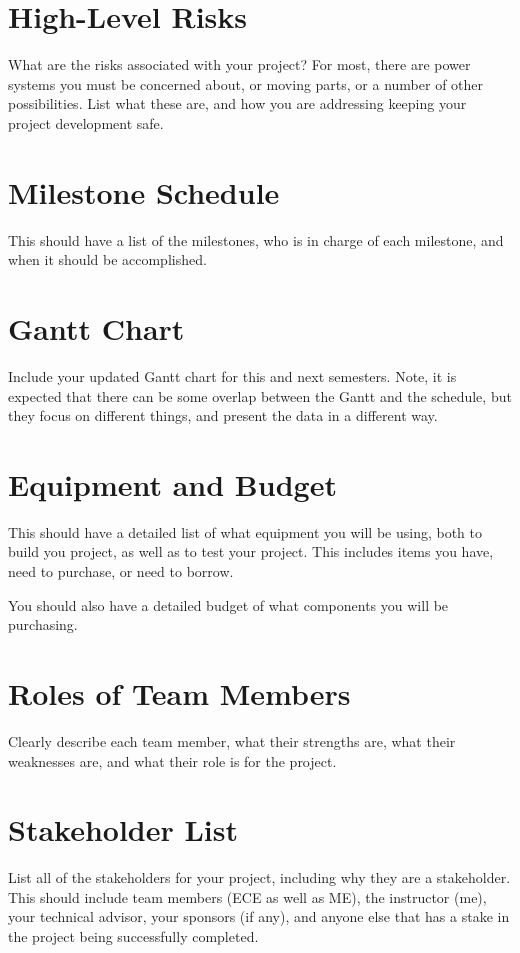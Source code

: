 \section{High-Level Risks}
What are the risks associated with your project?  For most, there are power systems you must be concerned about,
or moving parts, or a number of other possibilities.  List what these are, and how you are addressing keeping
your project development safe.

\section{Milestone Schedule}
This should have a list of the milestones, who is in charge of each milestone, and when it should be accomplished.

\section{Gantt Chart}
Include your updated Gantt chart for this and next semesters.  Note, it is expected that there can be some
overlap between the Gantt and the schedule, but they focus on different things, and present the data
in a different way.

\section{Equipment and Budget}
This should have a detailed list of what equipment you will be using, both to build you project, as well as to
test your project.  This includes items you have, need to purchase, or need to borrow.

You should also have a detailed budget of what components you will be purchasing.

\section{Roles of Team Members}
 Clearly describe each team member, what their strengths are, what their weaknesses are, and what their role is
 for the project.
 
 \section{Stakeholder List}
 List all of the stakeholders for your project, including why they are a stakeholder.
 This should include team members (ECE as well as ME), the instructor (me), your technical advisor, your sponsors (if any),
 and anyone else that has a stake in the project being successfully completed.
 
